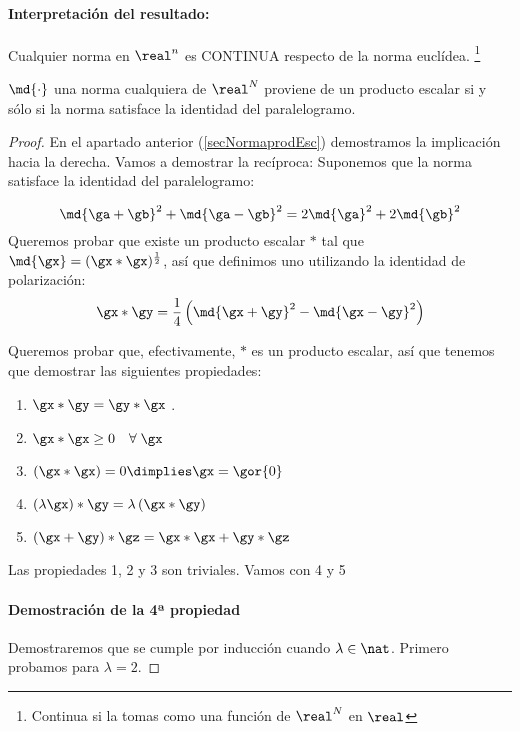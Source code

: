 \documentclass[a4paper,10pt]{apuntes}
\begin{document}
\paragraph{Interpretación del resultado:}
Cualquier norma en $\real^n$ es CONTINUA respecto de la norma euclídea. \footnote{Continua si la tomas como una función de $\real^N$ en $\real$}

\begin{theorem}
$\md{\cdot}$ una norma cualquiera de $\real^N$ proviene de un producto escalar si y sólo si la norma satisface la identidad del paralelogramo. 
\end{theorem}
\begin{proof}
En el apartado anterior (\ref{secNormaprodEsc}) demostramos la implicación hacia la derecha. Vamos a demostrar la recíproca:
Suponemos que la norma satisface la identidad del paralelogramo:

\begin{equation}
 \md{\ga+\gb}^2 + \md{\ga-\gb}^2 = 2 \md{\ga}^2 + 2\md{\gb}^2 \label{eqParalelogramo}
\end{equation}
Queremos probar que existe un producto escalar $\ast$ tal que $\md{\gx} = (\gx\ast \gx)^\frac{1}{2}$, así que definimos uno utilizando la identidad de polarización: \[ \gx\ast\gy = \frac{1}{4} \left( \md{\gx+\gy} ^ 2 - \md{\gx-\gy} ^ 2\right) \]

Queremos probar que, efectivamente, $\ast$ es un producto escalar, así que tenemos que demostrar las siguientes propiedades:
\begin{enumerate}
 \item $\gx\ast\gy = \gy\ast\gx$ .
 \item $\gx\ast\gx \ge 0\quad \forall\; \gx$
 \item $(\gx\ast\gx) = 0 \dimplies \gx=\gor{0}$ 
 \item $(\lambda \gx) \ast \gy = \lambda\left(\gx\ast\gy\right)$
 \item $(\gx+\gy)\ast\gz =\gx\ast\gx + \gy\ast\gz $
\end{enumerate}

Las propiedades 1, 2 y 3 son triviales. Vamos con 4 y 5

\paragraph{Demostración de la 4ª propiedad}

Demostraremos que se cumple por inducción cuando $\lambda\in\nat$. Primero probamos para $\lambda = 2$.


\end{proof}
\end{document}
